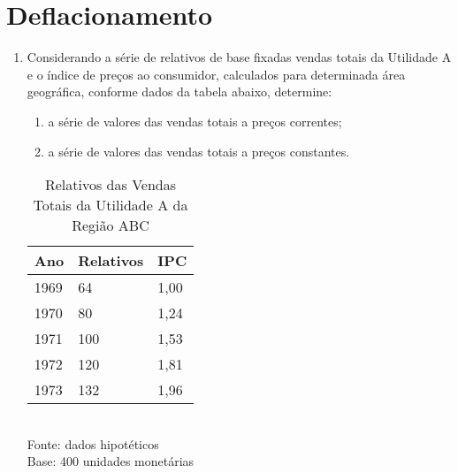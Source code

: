 \chapter{Deflacionamento}

\begin{enumerate}[resume]

\item Considerando a série de relativos de base fixadas vendas totais da Utilidade A e o índice de preços ao consumidor, calculados para determinada área geográfica, conforme dados da tabela abaixo, determine:
	\begin{enumerate}
	\item a série de valores das vendas totais a preços correntes;
	\item a série de valores das vendas totais a preços constantes.
	\end{enumerate}
	\begin{table}[!htb]
	\centering
	\caption{Relativos das Vendas Totais da Utilidade A da Região ABC}
	\vspace{0.5cm}
	\begin{tabular}{lll}
	Ano & Relativos & IPC \\
	\hline 
	1969 & 64 & 1,00  \\
	1970 & 80 & 1,24  \\
	1971 & 100 & 1,53  \\
	1972 & 120 & 1,81  \\
	1973 & 132 & 1,96  \\
	\end{tabular}\\
	Fonte: dados hipotéticos\\
	Base: 400 unidades monetárias
	\end{table}
	

\end{enumerate}
